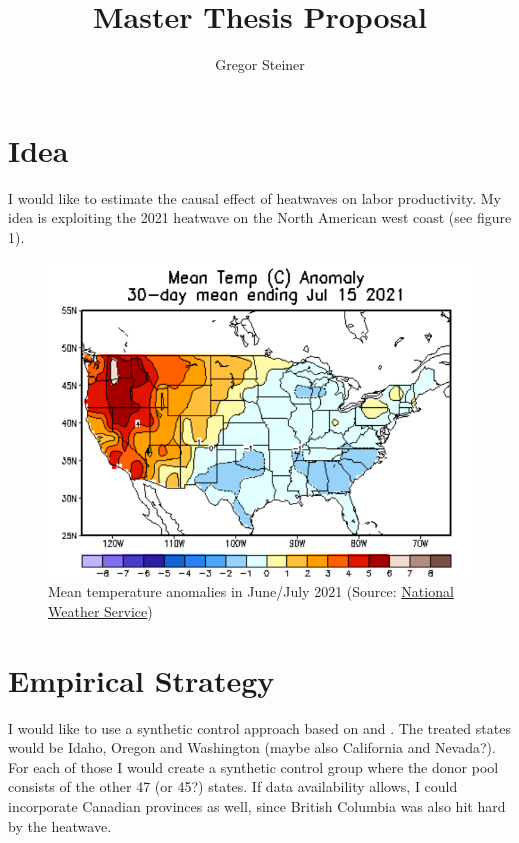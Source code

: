 \documentclass[11pt]{article}
\author{Gregor Steiner}
\title{Master Thesis Proposal}
\begin{document}
\maketitle

\section*{Idea}

I would like to estimate the causal effect of heatwaves on labor productivity. My idea is exploiting the 2021 heatwave on the North American west coast (see figure 1). 

\begin{figure}[h]
	\centering
	\includegraphics[scale = 0.6]{TempAnomMap}
	\caption{Mean temperature anomalies in June/July 2021 (Source: \href{https://www.cpc.ncep.noaa.gov/products/tanal/temp_analyses.php}{National Weather Service})}
\end{figure}


\section*{Empirical Strategy}

I would like to use a synthetic control approach based on \citet{Abadie2003} and \citet{Abadie2021}. The treated states would be Idaho, Oregon and Washington (maybe also California and Nevada?). For each of those I would create a synthetic control group where the donor pool consists of the other 47 (or 45?) states. If data availability allows, I could incorporate Canadian provinces as well, since British Columbia was also hit hard by the heatwave.
\end{document}
